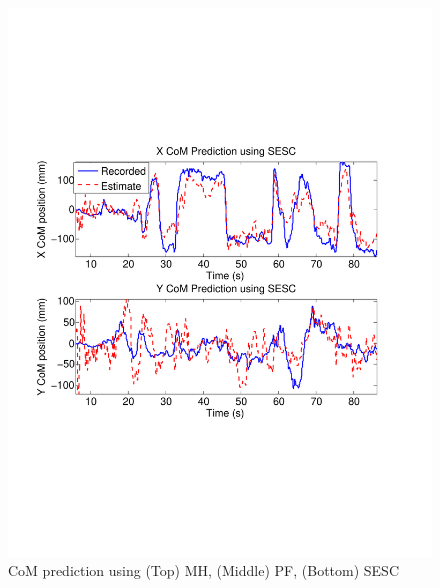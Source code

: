 \begin{figure}
\vskip -0.5cm
\includegraphics[trim=1cm 6cm 2cm 4cm, clip=true, width=\columnwidth]{figures/SESC_Test2.pdf}  
%   
\caption{CoM prediction using (Top) MH, (Middle) PF, (Bottom) SESC}
\label{fig:com1}
\end{figure}

